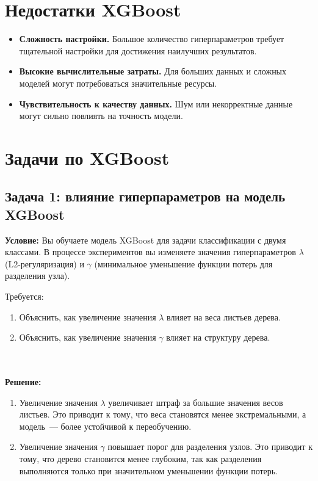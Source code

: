 \section*{Недостатки XGBoost}

\begin{itemize}
    \item \textbf{Сложность настройки.} Большое количество гиперпараметров требует тщательной настройки для достижения наилучших результатов.
    \item \textbf{Высокие вычислительные затраты.} Для больших данных и сложных моделей могут потребоваться значительные ресурсы.
    \item \textbf{Чувствительность к качеству данных.} Шум или некорректные данные могут сильно повлиять на точность модели.
\end{itemize}

\newpage
\section*{Задачи по XGBoost}

\subsection*{Задача 1: влияние гиперпараметров на модель XGBoost}
\textbf{Условие:} Вы обучаете модель XGBoost для задачи классификации с двумя классами. В процессе экспериментов вы изменяете значения гиперпараметров $\lambda$ (L2-регуляризация) и $\gamma$ (минимальное уменьшение функции потерь для разделения узла). 

Требуется:
\begin{enumerate}
    \item Объяснить, как увеличение значения $\lambda$ влияет на веса листьев дерева.
    \item Объяснить, как увеличение значения $\gamma$ влияет на структуру дерева.
\end{enumerate}
\\
\\
\textbf{Решение:}
\begin{enumerate}
    \item Увеличение значения $\lambda$ увеличивает штраф за большие значения весов листьев. Это приводит к тому, что веса становятся менее экстремальными, а модель~--- более устойчивой к переобучению.
    \item Увеличение значения $\gamma$ повышает порог для разделения узлов. Это приводит к тому, что дерево становится менее глубоким, так как разделения выполняются только при значительном уменьшении функции потерь.
\end{enumerate}

